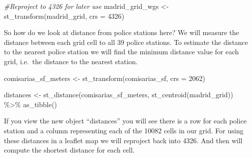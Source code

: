 \documentclass[
]{book}
\makeatletter
\newenvironment{Shaded}{\begin{snugshade}}{\end{snugshade}}
\newcommand{\AttributeTok}[1]{\textcolor[rgb]{0.61,0.61,0.61}{#1}}
\newcommand{\CommentTok}[1]{\textcolor[rgb]{0.37,0.37,0.37}{\textit{#1}}}
\newcommand{\DecValTok}[1]{\textcolor[rgb]{0.06,0.06,0.06}{#1}}
\newcommand{\FunctionTok}[1]{\textcolor[rgb]{0,0,0}{#1}}
\newcommand{\NormalTok}[1]{#1}
\newcommand{\OtherTok}[1]{\textcolor[rgb]{0.37,0.37,0.37}{#1}}
\newcommand{\SpecialCharTok}[1]{\textcolor[rgb]{0,0,0}{#1}}
\newenvironment{kframe}{%
\medskip{}
\setlength{\fboxsep}{.8em}
 \def\at@end@of@kframe{}%
 \ifinner\ifhmode%
  \def\at@end@of@kframe{\end{minipage}}%
  \begin{minipage}{\columnwidth}%
 \fi\fi%
 \def\FrameCommand##1{\hskip\@totalleftmargin \hskip-\fboxsep
 \colorbox{shadecolor}{##1}\hskip-\fboxsep
     \hskip-\linewidth \hskip-\@totalleftmargin \hskip\columnwidth}%
 \MakeFramed {\advance\hsize-\width
   \@totalleftmargin\z@ \linewidth\hsize
   \@setminipage}}%
 {\par\unskip\endMakeFramed%
 \at@end@of@kframe}
\renewenvironment{Shaded}{\begin{kframe}}{\end{kframe}}
\makeatother
\begin{document}
\begin{Shaded}
\begin{Highlighting}[]
\CommentTok{\#Reproject to 4326 for later use}
\NormalTok{madrid\_grid\_wgs }\OtherTok{\textless{}{-}} \FunctionTok{st\_transform}\NormalTok{(madrid\_grid, }\AttributeTok{crs =} \DecValTok{4326}\NormalTok{)}
\end{Highlighting}
\end{Shaded}

So how do we look at distance from police stations here? We will measure the distance between each grid cell to all 39 police stations. To estimate the distance to the nearest police station we will find the minimum distance value for each grid, i.e.~the distance to the nearest station.

\begin{Shaded}
\begin{Highlighting}[]
\NormalTok{comisarias\_sf\_meters }\OtherTok{\textless{}{-}} \FunctionTok{st\_transform}\NormalTok{(comisarias\_sf, }\AttributeTok{crs =} \DecValTok{2062}\NormalTok{)}

\NormalTok{distances }\OtherTok{\textless{}{-}} \FunctionTok{st\_distance}\NormalTok{(comisarias\_sf\_meters, }
                         \FunctionTok{st\_centroid}\NormalTok{(madrid\_grid)) }\SpecialCharTok{\%\textgreater{}\%} 
  \FunctionTok{as\_tibble}\NormalTok{()}
\end{Highlighting}
\end{Shaded}

If you view the new object ``distances'' you will see there is a row for each police station and a column representing each of the 10082 cells in our grid. For using these distances in a leaflet map we will reproject back into 4326. And then will compute the shortest distance for each cell.
\end{document}
